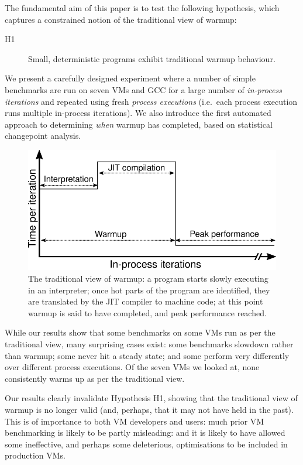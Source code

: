 \documentclass[preprint,numbers,10pt]{sigplanconf}
\newcommand{\hypone}{H1\xspace}
\begin{document}
The fundamental aim of this paper is to test the following hypothesis, which captures a constrained
notion of the traditional view of warmup:
\begin{description}
  \item[\hypone] Small, deterministic programs exhibit traditional warmup behaviour.
\end{description}
We present a carefully designed
experiment where a number of simple benchmarks are run on seven
VMs and GCC for a large number of \emph{in-process iterations} and repeated using fresh
\emph{process executions} (i.e.~each process execution runs multiple in-process
iterations). We also introduce the first automated approach to determining
\emph{when} warmup has completed, based on statistical changepoint analysis.

\begin{figure}[t]
\centering
\includegraphics[width=.475\textwidth]{img/picturebook_warmup}
\caption{The traditional view of warmup: a program starts slowly executing in
an interpreter; once hot parts of the program are identified, they are
translated by the JIT compiler to machine code; at this point warmup
is said to have completed, and peak performance reached.}
\label{fig:trad}
\end{figure}

While our results show that some benchmarks on some VMs run as per the traditional
view, many surprising cases exist: some benchmarks slowdown rather than
warmup; some never hit a steady state; and some perform very differently over
different process executions. Of the seven
VMs we looked at, none consistently warms up as per the traditional view.

Our results clearly invalidate Hypothesis H1, showing that the traditional
view of warmup is no longer valid (and, perhaps, that it may not have held in
the past). This is of importance to both VM developers and users:
much prior VM benchmarking is likely to be partly misleading: and it is
likely to have allowed some ineffective, and perhaps some deleterious,
optimisations to be included in production VMs.

\vspace{10pt}
\end{document}
